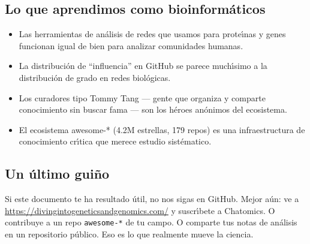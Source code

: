 \documentclass[11pt]{article}
\begin{document}
\subsection{Lo que aprendimos como bioinform\'{a}ticos}

\begin{itemize}
    \item Las herramientas de an\'{a}lisis de redes que usamos para prote\'{\i}nas y genes funcionan igual de bien para analizar comunidades humanas.
    \item La distribuci\'{o}n de ``influencia'' en GitHub se parece much\'{\i}simo a la distribuci\'{o}n de grado en redes biol\'{o}gicas.
    \item Los curadores tipo Tommy Tang --- gente que organiza y comparte conocimiento sin buscar fama --- son los h\'{e}roes an\'{o}nimos del ecosistema.
    \item El ecosistema awesome-* (4.2M estrellas, 179 repos) es una infraestructura de conocimiento cr\'{\i}tica que merece estudio sist\'{e}matico.
\end{itemize}

\subsection{Un \'{u}ltimo gui\~{n}o}

Si este documento te ha resultado \'{u}til, no nos sigas en GitHub. Mejor a\'{u}n: ve a \url{https://divingintogeneticsandgenomics.com/} y suscr\'{\i}bete a Chatomics. O contribuye a un repo \texttt{awesome-*} de tu campo. O comparte tus notas de an\'{a}lisis en un repositorio p\'{u}blico. Eso es lo que realmente mueve la ciencia.

\vspace{1cm}

\begin{center}
\end{center}

\end{document}
